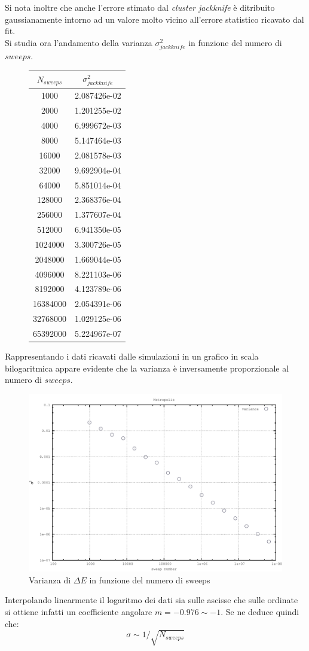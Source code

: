 Si nota inoltre che anche l'errore stimato dal \textit{cluster jackknife} è ditribuito gaussianamente intorno ad un valore molto vicino all'errore statistico ricavato dal fit.
\\

Si studia ora l'andamento della varianza $\sigma^2_{jackknife}$ in funzione del numero di $sweeps$.
\begin{figure}[H]
\centering
\begin{tabular}{|c|c|}
\hline
$N_{sweeps}$ & $\sigma^2_{jackknife}$\\
\hline
1000 & 2.087426e-02\\
2000 & 1.201255e-02\\
4000 & 6.999672e-03\\
8000 & 5.147464e-03\\
16000 & 2.081578e-03\\
32000 & 9.692904e-04\\
64000 & 5.851014e-04\\
128000 & 2.368376e-04\\
256000 & 1.377607e-04\\
512000 & 6.941350e-05\\
1024000 & 3.300726e-05\\
2048000 & 1.669044e-05\\
4096000 & 8.221103e-06\\
8192000 & 4.123789e-06\\
16384000 & 2.054391e-06\\
32768000 & 1.029125e-06\\
65392000 & 5.224967e-07\\
\hline
\end{tabular}
\label{tab:variance_tab}
\end{figure}
Rappresentando i dati ricavati dalle simulazioni in un grafico in scala bilogaritmica appare evidente che la varianza è inversamente proporzionale al numero di $sweeps$.
\begin{figure}[H]
\centering
\includegraphics[width=\textwidth]{variance}
\caption{Varianza di $\Delta E$ in funzione del numero di sweeps}
\label{fig:variance}
\end{figure}
Interpolando linearmente il logaritmo dei dati sia sulle ascisse che sulle ordinate si ottiene infatti un coefficiente angolare $m=-0.976\sim-1$. Se ne deduce quindi che: 
$$\sigma\sim1/\sqrt{N_{sweeps}}$$
